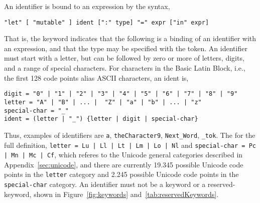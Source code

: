 An identifier is bound to an expression by the syntax,
%
\begin{lstlisting}[language=EBNF]
"let" [ "mutable" ] ident [":" type] "=" expr ["in" expr]
\end{lstlisting}
\begin{comment}
or alternatively
%
\begin{lstlisting}[language=EBNF]
"let" ["mutable"] ident [":" type] "=" expr ["in" newline indent exp]
\end{lstlisting}
\end{comment}
That is, the  keyword indicates that the following is a binding of an identifier with an expression, and that the type may be specified with the \idx{\token{:}} token. An identifier must start with a letter, but can be followed by zero or more of letters, digits, and a range of special characters. For characters in the Basic Latin Block, i.e., the first 128 code points alias ASCII characters, an ident is,
%
\begin{lstlisting}[language=EBNF]
digit = "0" | "1" | "2" | "3" | "4" | "5" | "6" | "7" | "8" | "9"
letter = "A" | "B" | ... |  "Z" | "a" | "b" | ... | "z"
special-char = "_"
ident = (letter | "_") {letter | digit | special-char}
\end{lstlisting}
%
Thus, examples of identifiers are \lstinline{a}, \lstinline{theCharacter9}, \lstinline{Next_Word}, \lstinline{_tok}. The for the full definition, \lstinline[language=EBNF]{letter = Lu | Ll | Lt | Lm | Lo | Nl} and \lstinline[language=EBNF]{special-char = Pc | Mn | Mc | Cf}, which referes to the Unicode general categories described in Appendix~\ref{sec:unicode}, and there are currently 19.345 possible Unicode code points in the \lstinline[language=EBNF]{letter} category and 2.245 possible Unicode code points in the \lstinline[language=EBNF]{special-char} category. An identifier must not be a keyword or a reserved-keyword, shown in Figure~\ref{fig:keywords} and~\ref{tab:reservedKeywords}.
